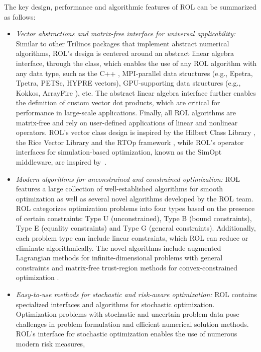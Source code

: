 The key design, performance and algorithmic features of ROL can be
summarized as follows:

\begin{itemize}
\item
\emph{Vector abstractions and matrix-free interface for universal applicability:}
Similar to other Trilinos packages that implement abstract numerical
algorithms, ROL's design is centered around an abstract linear algebra
interface, through the  class, which enables the use of any
ROL algorithm with any data type, such as the C++ , MPI-parallel
data structures (e.g., Epetra, Tpetra, PETSc, HYPRE vectors), GPU-supporting data
structures (e.g., Kokkos, ArrayFire \cite{Yalamanchili2015}), etc.  The abstract
linear algebra interface further enables the definition of custom vector dot
products, which are critical for performance in large-scale applications.
Finally, all ROL algorithms are matrix-free and rely on user-defined
applications of linear and nonlinear operators.  ROL's vector class design is
inspired by the Hilbert Class Library \cite{hcl}, the Rice Vector Library \cite{rvl}
and the RTOp framework \cite{rtop}, while ROL's operator interfaces for
simulation-based optimization, known as the SimOpt middleware,
are inspired by~\cite{Heinkenschloss1999}.
\item
\emph{Modern algorithms for unconstrained and constrained optimization:}
ROL features a large collection of well-established algorithms for smooth
optimization as well as several novel algorithms developed by the ROL team.
ROL categorizes optimization problems into four types based on the
presence of certain constraints: Type U (unconstrained), Type B (bound
constraints), Type E (equality constraints) and Type G (general constraints).
Additionally, each problem type can include linear constraints, which ROL can
reduce or eliminate algorithmically. The novel algorithms include augmented
Lagrangian methods for infinite-dimensional problems with general constraints
\cite{ALESQP} and matrix-free trust-region methods for convex-constrained
optimization \cite{Kouri2022}.
\item
\emph{Easy-to-use methods for stochastic and risk-aware optimization:}
ROL contains specialized interfaces and algorithms for stochastic optimization.
Optimization problems with stochastic and uncertain problem data pose challenges
in problem formulation and efficient numerical solution methods.  ROL's interface
for stochastic optimization enables the use of numerous modern risk measures,

\end{itemize}

